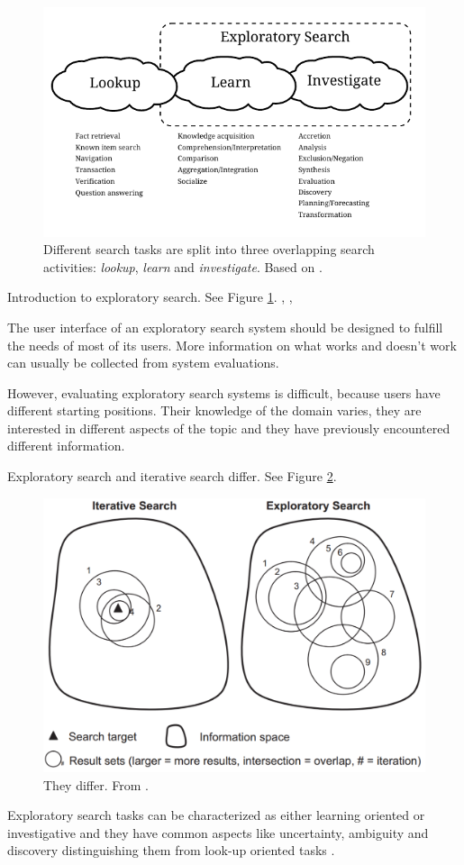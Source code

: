 \begin{figure}[htp] %
\caption{Different search tasks are split into three overlapping search activities: \textit{lookup}, \textit{learn} and \textit{investigate}. Based on \protect\cite{march06}.}
\label{figure_3clouds}
\centering
\includegraphics[scale=0.8]{figures/3clouds2.pdf}
\end{figure}

Introduction to exploratory search. See Figure \ref{figure_3clouds}.
\cite{march06}, \cite{white09}, \cite{tvaro11}

The user interface of an exploratory search system should be designed to fulfill the needs of most of its users. More information on what works and doesn't work can usually be collected from system evaluations.

However, evaluating exploratory search systems is difficult, because users have different starting positions. Their knowledge of the domain varies, they are interested in different aspects of the topic and they have previously encountered different information. \cite{kules08}

Exploratory search and iterative search differ. See Figure \ref{figure_IterativeVsExploratory}.

\begin{figure}[htp] %
\caption{They differ. From \protect\cite{white09}.}
\label{figure_IterativeVsExploratory}
\centering
\includegraphics[scale=0.25]{figures/IterativeSearch_vs_ExploratorySearch.pdf}
\end{figure}

Exploratory search tasks can be characterized as either learning oriented or investigative  and they have common aspects like uncertainty, ambiguity and discovery distinguishing them from look-up oriented tasks \cite{kules09}.

